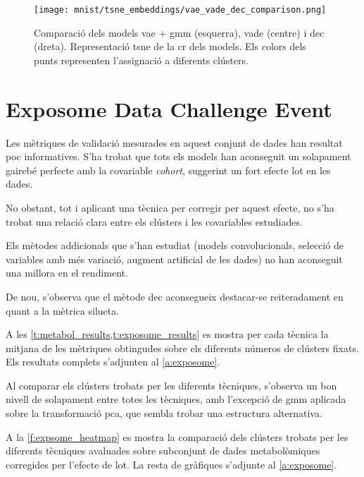 \documentclass[CAT,BIB]{TFUOC}%
\begin{document}
        \begin{figure}[p]
            \centering
            \texttt{[image: mnist/tsne\_embeddings/vae\_vade\_dec\_comparison.png]}
            \caption[Comparació dels models \gls{vae}, \gls{vade} i \gls{dec}]{
                Comparació dels models \gls{vae} + \gls{gmm} (esquerra), \gls{vade} (centre) i \gls{dec} (dreta).
                Representació \gls{tsne} de la \gls{cr} dels models.
                Els colors dels punts representen l'assignació a diferents clústers.
            }
            \label{f:vaevadedec_comp}
        \end{figure}


    \section{Exposome Data Challenge Event}
    \label{s:results_exposome}

        Les mètriques de validació mesurades en aquest conjunt de dades
        han resultat poc informatives.
        S'ha trobat que tots els models han aconseguit
        un solapament gairebé perfecte
        amb la covariable \textit{cohort},
        suggerint un fort efecte lot en les dades.

        No obstant,
        tot i aplicant una tècnica per corregir per aquest efecte,
        no s'ha trobat una relació clara entre els clústers
        i les covariables estudiades.

        Els mètodes addicionals que s'han estudiat
        (models convolucionals,
        selecció de variables amb més variació,
        augment artificial de les dades)
        no han aconseguit una millora en el rendiment.

        De nou, s'observa que el mètode \gls{dec}
        aconsegueix destacar-se reiteradament en quant a la mètrica silueta.

        A les \cref{t:metabol_results,t:exposome_results} es mostra
        per cada tècnica
        la mitjana de les mètriques obtingudes
        sobre els diferents números de clústers fixats.
        Els resultats complets s'adjunten al \cref{a:exposome}.

        Al comparar els clústers trobats per les diferents tècniques,
        s'observa un bon nivell de solapament entre totes les tècniques,
        amb l'excepció de \gls{gmm} aplicada sobre la transformació \gls{pca},
        que sembla trobar una estructura alternativa.

        A la \cref{f:expsome_heatmap} es mostra la comparació dels clústers
        trobats per les diferents tècniques avaluades
        sobre subconjunt de dades metabolòmiques corregides per l'efecte de lot.
        La resta de gràfiques s'adjunte al \cref{a:exposome}.
\end{document}
